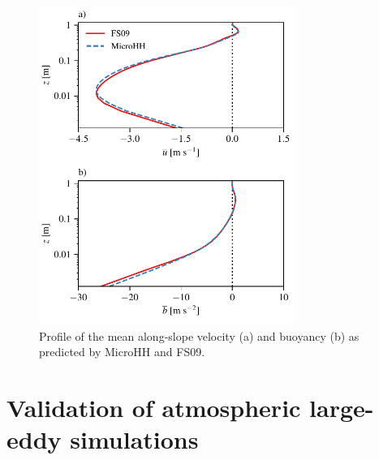 \documentclass[gmd]{copernicus}
\begin{document}
\begin{figure}[t]
	\vspace*{2mm}
	\begin{center}
		\includegraphics[width=8.3cm]{figs/katabatic.pdf}
	\end{center}
	\caption{Profile of the mean along-slope velocity (a) and buoyancy (b) as predicted by MicroHH and FS09.}
	\label{fig:katabatic}
\end{figure}

\section{Validation of atmospheric large-eddy simulations}
\end{document}
